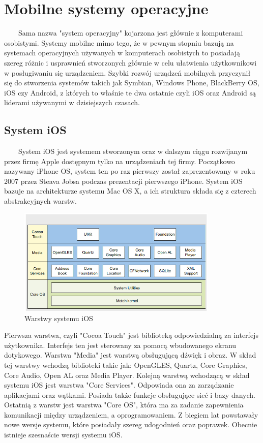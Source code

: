 \documentclass[a4paper,12pt,oneside]{book}
\begin{document}
	\section{Mobilne systemy operacyjne}
	\ \ \ \
	Sama nazwa "system operacyjny" kojarzona jest głównie z komputerami osobistymi. Systemy mobilne mimo tego, że w pewnym stopniu bazują na systemach operacyjnych używanych w komputerach osobistych to posiadają szereg różnic i usprawnień stworzonych głównie w celu ułatwienia użytkownikowi w posługiwaniu się urządzeniem. Szybki rozwój urządzeń mobilnych przyczynił się do stworzenia systemów takich jak Symbian, Windows Phone, BlackBerry OS, iOS czy Android, z których to właśnie te dwa ostatnie czyli iOS oraz Android są liderami używanymi w dzisiejszych czasach.
	
	\subsection{System iOS}
	\ \ \ \
	System iOS jest systemem stworzonym oraz w dalszym ciągu rozwijanym przez firmę Apple dostępnym tylko na urządzeniach tej firmy. Początkowo nazywany iPhone OS, system ten po raz pierwszy został zaprezentowany w roku 2007 przez Steava Jobsa podczas prezentacji pierwszego iPhone. System iOS bazuje na architekturze systemu Mac OS X, a ich struktura składa się z czterech abstrakcyjnych warstw.
	
	\newpage
	
	\begin{figure}[h]
		\centering
		\includegraphics[width=0.85\textwidth]{grafika/warstwy_ios.png}
		\caption{Warstwy systemu iOS}
	\end{figure}

	Pierwsza warstwa, czyli "Cocoa Touch" jest biblioteką odpowiedzialną za interfejs użytkownika. Interfejs ten jest sterowany za pomocą wbudowanego ekranu dotykowego. Warstwa "Media" jest warstwą obsługującą dźwięk i obraz. W skład tej warstwy wchodzą biblioteki takie jak: OpenGLES, Quartz, Core Graphics, Core Audio, Open AL oraz Media Player. Kolejną warstwą wchodzącą w skład systemu iOS jest warstwa "Core Services". Odpowiada ona za zarządzanie aplikacjami oraz wątkami. Posiada także funkcje obsługujące sieć i bazy danych. Ostatnią z warstw jest warstwa "Core OS", która ma za zadanie zapewnienia komunikacji między urządzeniem, a oprogramowaniem. Z biegiem lat powstawały nowe wersje systemu, które posiadały szereg udogodnień oraz poprawek. Obecnie istnieje szesnaście wersji systemu iOS. 
	
\end{document}
